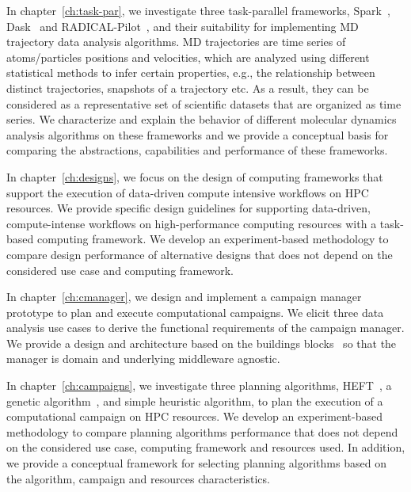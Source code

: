 In chapter~\ref{ch:task-par}, we investigate three task-parallel frameworks,
Spark~\cite{zaharia2010spark}, Dask~\cite{rocklin2015dask} and
RADICAL-Pilot~\cite{merzky2019using}, and their suitability for implementing
MD trajectory data analysis algorithms. MD trajectories are time series of
atoms/particles positions and velocities, which are analyzed using different
statistical methods to infer certain properties, e.g., the relationship
between distinct trajectories, snapshots of a trajectory etc. As a result,
they can be considered as a representative set of scientific datasets that are
organized as time series. We characterize and explain the behavior of
different molecular dynamics analysis algorithms on these frameworks and we
provide a conceptual basis for comparing the abstractions, capabilities and
performance of these frameworks.

In chapter~\ref{ch:designs}, we focus on the design of computing frameworks 
that support the execution of data-driven compute intensive workflows on HPC 
resources. We provide specific design guidelines for supporting data-driven, 
compute-intense workflows on high-performance computing resources with a 
task-based computing framework. We develop an experiment-based methodology to 
compare design performance of alternative designs that does not depend on the 
considered use case and computing framework.

In chapter~\ref{ch:cmanager}, we design and implement a campaign manager 
prototype to plan and execute computational campaigns. We elicit three data 
analysis use cases to derive the functional requirements of the campaign 
manager. We provide a design and architecture based on the buildings 
blocks~\cite{turilli2019middleware} so that the manager is domain and 
underlying middleware agnostic.

In chapter~\ref{ch:campaigns}, we investigate three planning algorithms,
HEFT~\cite{topcuoglu2002performance}, a genetic
algorithm~\cite{page2005algorithm}, and simple heuristic algorithm, to plan
the execution of a computational campaign on HPC resources. We develop an
experiment-based methodology to compare planning algorithms performance that
does not depend on the considered use case, computing framework and resources
used. In addition, we provide a conceptual framework for selecting planning
algorithms based on the algorithm, campaign and resources characteristics.

